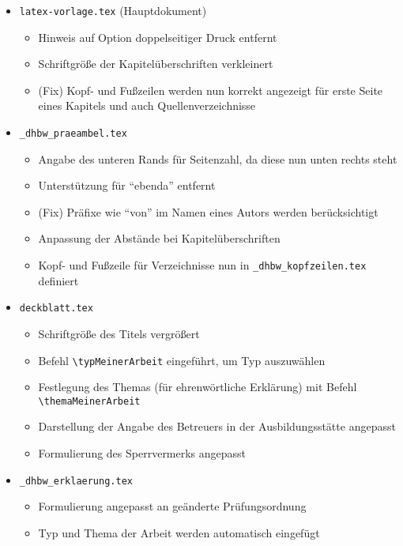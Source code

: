 \begin{itemize}
\item \verb|latex-vorlage.tex| (Hauptdokument)
\begin{itemize}
\item Hinweis auf Option doppelseitiger Druck entfernt
\item Schriftgröße der Kapitelüberschriften verkleinert
\item (Fix) Kopf- und Fußzeilen werden nun korrekt angezeigt für erste Seite eines Kapitels und auch  Quellenverzeichnisse
\end{itemize}

\item \verb|_dhbw_praeambel.tex|
\begin{itemize}
\item Angabe des unteren Rands für Seitenzahl, da diese nun unten rechts steht
\item Unterstützung für \enquote{ebenda} entfernt
\item (Fix) Präfixe wie \enquote{von} im Namen eines Autors werden berücksichtigt
\item Anpassung der Abstände bei Kapitelüberschriften
\item Kopf- und Fußzeile für Verzeichnisse nun in \verb|_dhbw_kopfzeilen.tex| definiert 
\end{itemize}


\item \verb|deckblatt.tex|
\begin{itemize}
\item Schriftgröße des Titels vergrößert
\item Befehl \verb|\typMeinerArbeit| eingeführt, um Typ auszuwählen
\item Festlegung des Themas (für ehrenwörtliche Erklärung) mit Befehl \verb|\themaMeinerArbeit|
\item Darstellung der Angabe des Betreuers in der Ausbildungsstätte angepasst
\item Formulierung des Sperrvermerks angepasst  
\end{itemize}

\item \verb|_dhbw_erklaerung.tex|
\begin{itemize}
\item Formulierung angepasst an geänderte Prüfungsordnung
\item Typ und Thema der Arbeit werden automatisch eingefügt
\end{itemize}


\end{itemize}
